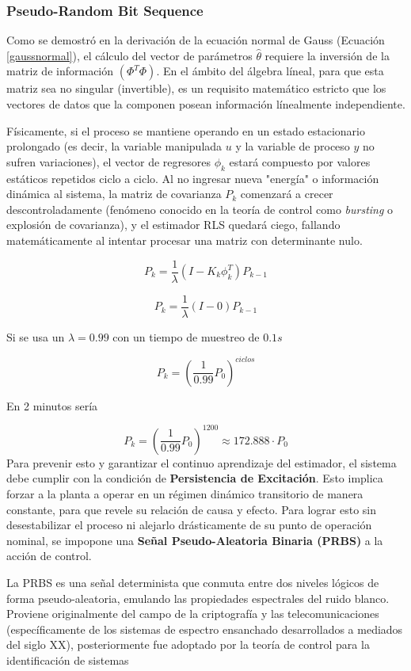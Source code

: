 \subsubsection{Pseudo-Random Bit Sequence}
Como se demostró en la derivación de la ecuación normal de Gauss (Ecuación \ref{gaussnormal}), el cálculo del vector de parámetros $\hat{\theta}$ requiere la inversión de la matriz de información $(\Phi^T\Phi)$. En el ámbito del álgebra líneal, para que esta matriz sea no singular (invertible), es un requisito matemático estricto que los vectores de datos que la componen posean información línealmente independiente.

Físicamente, si el proceso se mantiene operando en un estado estacionario prolongado (es decir, la variable manipulada $u$ y la variable de proceso $y$ no sufren variaciones), el vector de regresores $\phi_k$ estará compuesto por valores estáticos repetidos ciclo a ciclo. Al no ingresar nueva "energía" o información dinámica al sistema, la matriz de covarianza $P_k$ comenzará a crecer descontroladamente (fenómeno conocido en la teoría de control como \textit{bursting} o explosión de covarianza), y el estimador RLS quedará ciego, fallando matemáticamente al intentar procesar una matriz con determinante nulo.

\[
  P_k = \frac{1}{\lambda} (I - K_k \phi_k^T) P_{k-1}
\]

\[
  P_k = \frac{1}{\lambda} (I - 0) P_{k-1}
\]


Si se usa un $\lambda = 0.99$ con un tiempo de muestreo de $0.1 s$

\[
  P_k = (\frac{1}{0.99} P_{0})^{ciclos}
\]

En 2 minutos sería

\[
P_k = (\frac{1}{0.99} P_{0})^{1200} \approx 172.888\cdot P_0 
\]
Para prevenir esto y garantizar el continuo aprendizaje del estimador, el sistema debe cumplir con la condición de \textbf{Persistencia de Excitación}. Esto implica forzar a la planta a operar en un régimen dinámico transitorio de manera constante, para que revele su relación de causa y efecto. Para lograr esto sin desestabilizar el proceso ni alejarlo drásticamente de su punto de operación nominal, se impopone una \textbf{Señal Pseudo-Aleatoria Binaria (PRBS)} a la acción de control.

La PRBS es una señal determinista que conmuta entre dos niveles lógicos de forma pseudo-aleatoria, emulando las propiedades espectrales del ruido blanco. Proviene originalmente del campo de la criptografía y las telecomunicaciones (específicamente de los sistemas de espectro ensanchado desarrollados a mediados del siglo XX), posteriormente fue adoptado por la teoría de control para la identificación de sistemas

